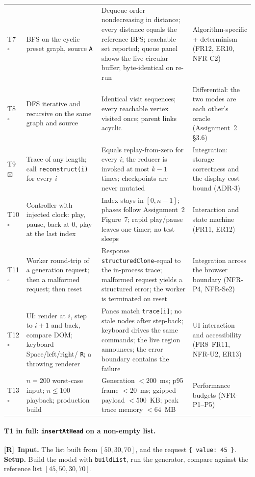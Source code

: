 \documentclass[11pt,a4paper]{article}
\newcommand{\R}{\textcolor{reqc}{\textbf{[R]}}}     %
\newcommand{\ct}[1]{\texttt{#1}}
\newcommand{\done}{\textcolor{okc}{$\boxtimes$}}
\newcommand{\todo}{\textcolor{rulec}{$\square$}}
\begin{document}
{\begin{longtable}{@{}L{0.8cm}L{4.2cm}L{5.6cm}L{3.6cm}@{}}
T7 \todo & BFS on the cyclic preset graph, source \ct{A} & Dequeue order nondecreasing in
distance; every distance equals the reference BFS; reachable set reported; queue panel shows
the live circular buffer; byte-identical on re-run & Algorithm-specific + determinism
(FR12, ER10, NFR-C2) \\
T8 \todo & DFS iterative and recursive on the same graph and source & Identical visit
sequences; every reachable vertex visited once; parent links acyclic & Differential: the two
modes are each other's oracle (Assignment~2 \S3.6) \\
T9 \done & Trace of any length; call \ct{reconstruct(i)} for every $i$ & Equals
replay-from-zero for every $i$; the reducer is invoked at most $k-1$ times; checkpoints are
never mutated & Integration: storage correctness and the display cost bound (ADR-3) \\
T10 \todo & Controller with injected clock: play, pause, back at $0$, play at the last index &
Index stays in $[0, n-1]$; phases follow Assignment~2 Figure~7; rapid play/pause leaves one
timer; no test sleeps & Interaction and state machine (FR11, ER12) \\
T11 \todo & Worker round-trip of a generation request; then a malformed request; then reset &
Response \ct{structuredClone}-equal to the in-process trace; malformed request yields a
structured error; the worker is terminated on reset & Integration across the browser boundary
(NFR-P4, NFR-Se2) \\
T12 \todo & UI: render at $i$, step to $i+1$ and back, compare DOM; keyboard Space/left/right/
\ct{R}; a throwing renderer & Panes match \ct{trace[i]}; no stale nodes after step-back;
keyboard drives the same commands; the live region announces; the error boundary contains the
failure & UI interaction and accessibility (FR8--FR11, NFR-U2, ER13) \\
T13 \todo & $n = 200$ worst-case input; $n \le 100$ playback; production build & Generation
$< 200$~ms; p95 frame $< 20$~ms; gzipped payload $< 500$~KB; peak trace memory $< 64$~MB &
Performance budgets (NFR-P1--P5) \\
\end{longtable}
}

\paragraph{T1 in full: \ct{insertAtHead} on a non-empty list.}
\R\ \textbf{Input.} The list built from $[50, 30, 70]$, and the request
\ct{\{ value: 45 \}}. \textbf{Setup.} Build the model with \ct{buildList}, run the generator,
compare against the reference list $[45, 50, 30, 70]$.
\end{document}
